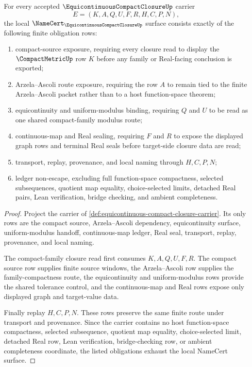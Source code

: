 \begin{theorem}
\label{thm:equicontinuous-compact-closure-namecert-obligations}
For every accepted $\EquicontinuousCompactClosureUp$ carrier
$$
E=(K,A,Q,U,F,R,H,C,P,N),
$$
the local $\NameCert_{\EquicontinuousCompactClosureUp}$ surface consists exactly of the following finite obligation rows:
\begin{enumerate}
\item compact-source exposure, requiring every closure read to display the $\CompactMetricUp$ row $K$ before any family or Real-facing conclusion is exported;
\item Arzela--Ascoli route exposure, requiring the row $A$ to remain tied to the finite Arzela--Ascoli packet rather than to a host function-space theorem;
\item equicontinuity and uniform-modulus binding, requiring $Q$ and $U$ to be read as one shared compact-family modulus route;
\item continuous-map and Real sealing, requiring $F$ and $R$ to expose the displayed graph rows and terminal Real seals before target-side closure data are read;
\item transport, replay, provenance, and local naming through $H,C,P,N$;
\item ledger non-escape, excluding full function-space compactness, selected subsequences, quotient map equality, choice-selected limits, detached Real pairs, Lean verification, bridge checking, and ambient completeness.
\end{enumerate}
\end{theorem}
\begin{proof}
Project the carrier of \autoref{def:equicontinuous-compact-closure-carrier}. Its only rows are the compact source, Arzela--Ascoli dependency, equicontinuity surface, uniform-modulus handoff, continuous-map ledger, Real seal, transport, replay, provenance, and local naming.

The compact-family closure read first consumes $K,A,Q,U,F,R$. The compact source row supplies finite source windows, the Arzela--Ascoli row supplies the family-compactness route, the equicontinuity and uniform-modulus rows provide the shared tolerance control, and the continuous-map and Real rows expose only displayed graph and target-value data.

Finally replay $H,C,P,N$. These rows preserve the same finite route under transport and provenance. Since the carrier contains no host function-space compactness, selected subsequence, quotient map equality, choice-selected limit, detached Real row, Lean verification, bridge-checking row, or ambient completeness coordinate, the listed obligations exhaust the local NameCert surface.
\end{proof}

